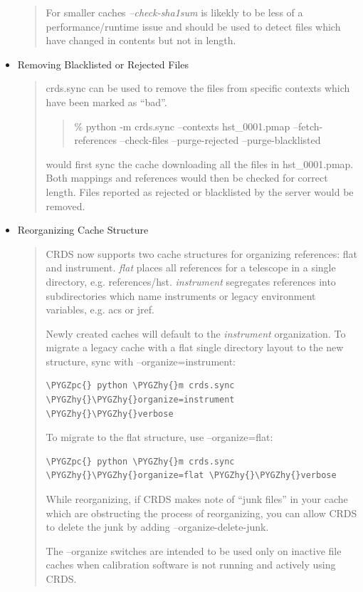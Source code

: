 \documentclass[letterpaper,10pt,english]{sphinxmanual}
\def\PYGZpc{\char`\%}
\def\PYGZhy{\char`\-}
\begin{document}
\begin{itemize}
\begin{quote}
For smaller caches \emph{--check-sha1sum} is likekly to be less of a performance/runtime issue and should be used
to detect files which have changed in contents but not in length.
\end{quote}

\item {} 
Removing Blacklisted or Rejected Files
\begin{quote}

crds.sync can be used to remove the files from specific contexts which have been marked as ``bad''.
\begin{quote}

\% python -m crds.sync --contexts hst\_0001.pmap --fetch-references --check-files --purge-rejected --purge-blacklisted
\end{quote}

would first sync the cache downloading all the files in hst\_0001.pmap.  Both mappings and references would then
be checked for correct length.   Files reported as rejected or blacklisted by the server would be removed.
\end{quote}

\item {} 
Reorganizing Cache Structure
\begin{quote}

CRDS now supports two cache structures for organizing references: flat and instrument.  \emph{flat} places all references
for a telescope in a single directory,  e.g. references/hst.   \emph{instrument} segregates references into subdirectories
which name instruments or legacy environment variables,  e.g. acs or jref.

Newly created caches will default to the \emph{instrument} organization.  To migrate a legacy cache with a flat single
directory layout to the new structure,  sync with --organize=instrument:

\begin{Verbatim}[commandchars=\\\{\}]
\PYGZpc{} python \PYGZhy{}m crds.sync \PYGZhy{}\PYGZhy{}organize=instrument \PYGZhy{}\PYGZhy{}verbose
\end{Verbatim}

To migrate to the flat structure,  use --organize=flat:

\begin{Verbatim}[commandchars=\\\{\}]
\PYGZpc{} python \PYGZhy{}m crds.sync \PYGZhy{}\PYGZhy{}organize=flat \PYGZhy{}\PYGZhy{}verbose
\end{Verbatim}

While reorganizing, if CRDS makes note of ``junk files'' in your cache which are
obstructing the process of reorganizing, you can allow CRDS to delete the junk
by adding --organize-delete-junk.

The --organize switches are intended to be used only on inactive file caches
when calibration software is not running and actively using CRDS.
\end{quote}

\end{itemize}
\end{document}
